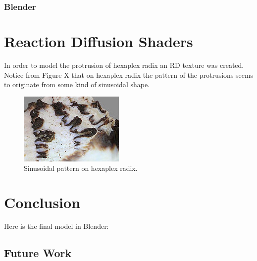 \documentclass[a4paper]{article}
\begin{document}
\subsubsection{Blender}

\section{Reaction Diffusion Shaders}

In order to model the protrusion of hexaplex radix an RD texture was created. Notice from Figure X that on hexaplex radix the pattern of the protrusions seems to originate from some kind of sinusoidal shape.

\begin{figure}[h]
	\centering\includegraphics[scale=1.0]{./img/hexaplex_radix_sine.jpg}
	\caption{Sinusoidal pattern on hexaplex radix.}
	\label{hexaplex-sine} %
\end{figure}




\section{Conclusion}

Here is the final model in Blender:

\subsection{Future Work}





\end{document}
